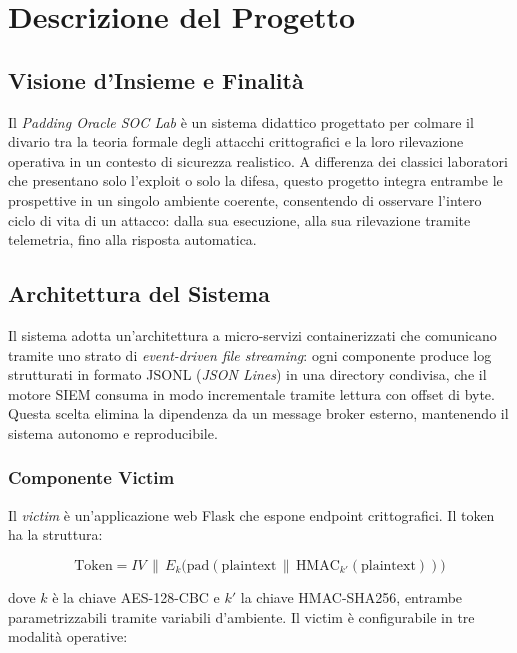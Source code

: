 \documentclass[12pt,a4paper]{article}
\begin{document}
\section{Descrizione del Progetto}

\subsection{Visione d'Insieme e Finalità}

Il \emph{Padding Oracle SOC Lab} è un sistema didattico progettato per colmare il divario
tra la teoria formale degli attacchi crittografici e la loro rilevazione operativa in un
contesto di sicurezza realistico. A differenza dei classici laboratori che presentano
solo l'exploit o solo la difesa, questo progetto integra entrambe le prospettive in un
singolo ambiente coerente, consentendo di osservare l'intero ciclo di vita di un attacco:
dalla sua esecuzione, alla sua rilevazione tramite telemetria, fino alla risposta automatica.

\subsection{Architettura del Sistema}

Il sistema adotta un'architettura a micro-servizi containerizzati che comunicano tramite
uno strato di \emph{event-driven file streaming}: ogni componente produce log strutturati
in formato JSONL (\emph{JSON Lines}) in una directory condivisa, che il motore SIEM
consuma in modo incrementale tramite lettura con offset di byte. Questa scelta elimina la
dipendenza da un message broker esterno, mantenendo il sistema autonomo e reproducibile.

\subsubsection{Componente Victim}

Il \emph{victim} è un'applicazione web Flask che espone endpoint crittografici. Il token
ha la struttura:

\[
  \text{Token} = IV \,\|\, E_k\!\bigl(\text{pad}(\text{plaintext} \,\|\, \text{HMAC}_{k'}(\text{plaintext}))\bigr)
\]

dove $k$ è la chiave AES-128-CBC e $k'$ la chiave HMAC-SHA256, entrambe parametrizzabili
tramite variabili d'ambiente. Il victim è configurabile in tre modalità operative:
\end{document}
